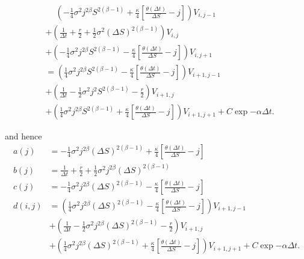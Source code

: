 \begin{align*}
		&\phantom{+} \left(-\frac{1}{4}\sigma^2j^{2\beta}S^{2(\beta -1)}+ \frac{\kappa}{4}\left[\frac{\theta(\Delta t)}{\Delta S} - j\right]\right)V_{i,j-1} \\
		&+ \left(\frac{1}{\Delta t} + \frac{r}{2} + \frac{1}{2}\sigma^2 \left(\Delta S\right)^{2(\beta - 1)} \right)V_{i,j} \\
		&+ \left( -\frac{1}{4}\sigma^2j^{2\beta}S^{2(\beta -1)} - \frac{\kappa}{4}\left[\frac{\theta(\Delta t)}{\Delta S} - j\right]\right) V_{i, j+1}\\
		&= \left(\frac{1}{4}\sigma^2 j^{2\beta}S^{2(\beta - 1)} - \frac{\kappa}{4}\left[\frac{\theta(\Delta t)}{\Delta S} - j\right]\right)V_{i+1,j-1}\\
		&+ \left(\frac{1}{\Delta t } - \frac{1}{2}\sigma^2 j^2S^{2(\beta - 1)}  - \frac{r}{2}\right)V_{i+1,j}\\
		&+ \left(\frac{1}{4}\sigma^2 j^{2\beta}S^{2(\beta - 1)}+ \frac{\kappa}{4}\left[\frac{\theta(\Delta t)}{\Delta S} - j\right]\right)V_{i+1,j+1} + C \exp{-\alpha \Delta t}.
\end{align*}

and hence
\begin{equation}
	\begin{aligned}
		a(j) &= -\frac{1}{4}\sigma^2j^{2\beta}(\Delta S)^{2(\beta -1) }+ \frac{\kappa}{4}\left[\frac{\theta(\Delta t)}{\Delta S} - j\right] \\
		b(j) &= \frac{1}{\Delta t} + \frac{r}{2} + \frac{1}{2}\sigma^2 j^{2\beta}(\Delta S)^{2(\beta -1) }\\
		c(j) &=  -\frac{1}{4}\sigma^2j^{2\beta}(\Delta S)^{2(\beta -1) } - \frac{\kappa}{4}\left[\frac{\theta(\Delta t)}{\Delta S} - j\right]\\
		d(i,j)&=\left(\frac{1}{4}\sigma^2 j^{2\beta}(\Delta S)^{2(\beta -1) } - \frac{\kappa}{4}\left[\frac{\theta(\Delta t)}{\Delta S} - j\right]\right)V_{i+1,j-1}\\
		&+ \left(\frac{1}{\Delta t } - \frac{1}{2}\sigma^2 j^{2\beta}(\Delta S)^{2(\beta -1) }  - \frac{r}{2}\right)V_{i+1,j}\\
		&+ \left(\frac{1}{4}\sigma^2 j^{2\beta}(\Delta S)^{2(\beta -1) }+ \frac{\kappa}{4}\left[\frac{\theta(\Delta t)}{\Delta S} - j\right]\right)V_{i+1,j+1} + C \exp{-\alpha \Delta t}.
	\end{aligned}
\end{equation}

